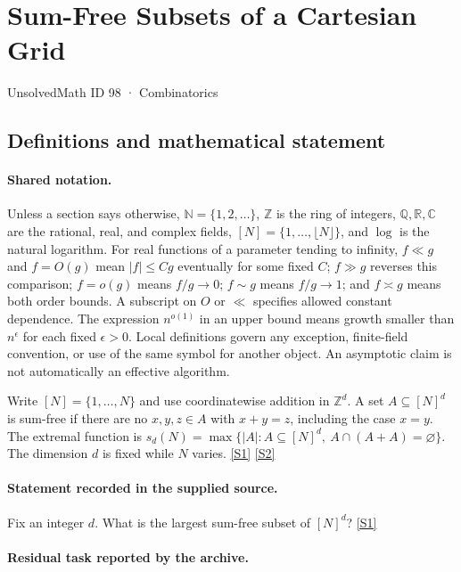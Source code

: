 \documentclass[11pt,a4paper]{article}
\newcommand{\N}{\mathbb{N}}
\newcommand{\Z}{\mathbb{Z}}
\newcommand{\Q}{\mathbb{Q}}
\newcommand{\R}{\mathbb{R}}
\newcommand{\C}{\mathbb{C}}
\newcommand{\sref}[2]{\hyperlink{source:#1:#2}{[S#2]}}
\begin{document}

\setcounter{section}{97}

\section{Sum-Free Subsets of a Cartesian Grid}\label{98}

{\small\sffamily UnsolvedMath ID 98 · Combinatorics}

\subsection{Definitions and mathematical statement}

\paragraph{Shared notation.}Unless a section says otherwise, $\N=\{1,2,\ldots\}$,
$\Z$ is the ring of integers, $\Q,\R,\C$ are the rational, real, and complex
fields, $[N]=\{1,\ldots,\lfloor N\rfloor\}$, and $\log$ is the natural
logarithm. For real functions of a parameter tending to infinity,
$f\ll g$ and $f=O(g)$ mean $|f|\leq Cg$ eventually for some fixed $C$;
$f\gg g$ reverses this comparison; $f=o(g)$ means $f/g\to0$;
$f\sim g$ means $f/g\to1$; and $f\asymp g$ means both order bounds.
A subscript on $O$ or $\ll$ specifies allowed constant dependence.
The expression $n^{o(1)}$ in an upper bound means growth smaller than
$n^\epsilon$ for each fixed $\epsilon>0$. Local definitions govern any
exception, finite-field convention, or use of the same symbol for another
object. An asymptotic claim is not automatically an effective algorithm.



Write $[N]=\{1,\ldots,N\}$ and use coordinatewise addition in $\Z^d$. A set $A\subseteq[N]^d$ is sum-free if there are no $x,y,z\in A$ with $x+y=z$, including the case $x=y$. The extremal function is $s_d(N)=\max\{|A|:A\subseteq[N]^d,\ A\cap(A+A)=\varnothing\}$. The dimension $d$ is fixed while $N$ varies. \sref{98}{1} \sref{98}{2}

\paragraph{Statement recorded in the supplied source.}
Fix an integer $d$. What is the largest sum-free subset of $[N]^d$? \sref{98}{1}

\paragraph{Residual task reported by the archive.}
\end{document}
